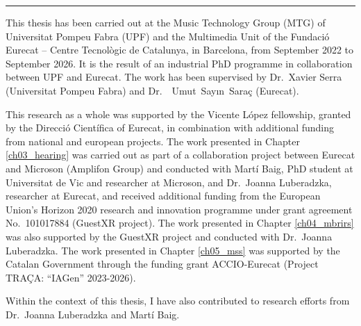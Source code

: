 \vspace*{\fill}

\begin{center}
\rule{4cm}{0.2pt}
\end{center}

This thesis has been carried out at the Music Technology Group (MTG) of Universitat Pompeu Fabra (UPF) and the Multimedia Unit of the Fundació Eurecat -- Centre Tecnològic de Catalunya, in Barcelona, from September 2022 to September 2026. It is the result of an industrial PhD programme in
collaboration between UPF and Eurecat. The work has been supervised by Dr.~Xavier Serra (Universitat Pompeu Fabra) and Dr.~~Umut~Say\i n~Saraç (Eurecat).

This research as a whole was supported by the Vicente López fellowship, granted by the Direcció Científica of Eurecat, in combination with additional funding from national and european projects. The work presented in Chapter \ref{ch03_hearing} was carried out as part of a collaboration project between Eurecat and Microson (Amplifon Group) and conducted with Martí Baig, PhD student at Universitat de Vic and researcher at Microson, and Dr.~Joanna Luberadzka, researcher at Eurecat, and received additional funding from the European Union's Horizon 2020 research and innovation programme under grant agreement No.~101017884 (GuestXR project). The work presented in Chapter \ref{ch04_mbrirs} was also supported by the GuestXR project and conducted with Dr.~Joanna Luberadzka. The work presented in Chapter \ref{ch05_mss} was supported by the Catalan Government through the funding grant ACCIO-Eurecat (Project TRAÇA: “IAGen” 2023-2026).

Within the context of this thesis, I have also contributed to research efforts from Dr.~Joanna Luberadzka and Martí Baig.